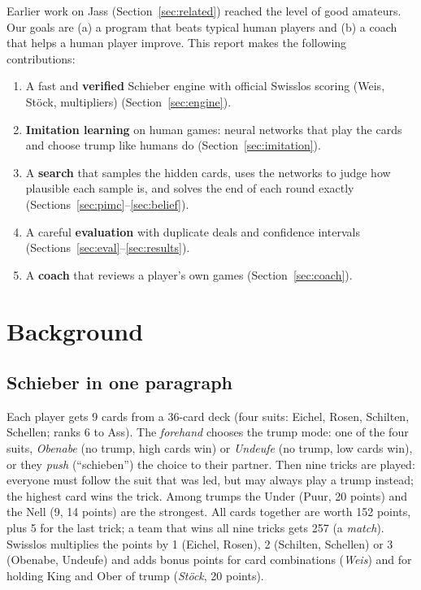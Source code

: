 \documentclass[10pt,a4paper]{article}
\begin{document}
Earlier work on Jass (Section~\ref{sec:related}) reached the level of good amateurs. Our goals are (a) a program that
beats typical human players and (b) a coach that helps a human player improve. This report makes the following
contributions:
\begin{enumerate}
\item A fast and \textbf{verified} Schieber engine with official Swisslos scoring (Weis, St\"ock, multipliers)
  (Section~\ref{sec:engine}).
\item \textbf{Imitation learning} on \NGames{} human games: neural networks that play the cards and choose trump
  like humans do (Section~\ref{sec:imitation}).
\item A \textbf{search} that samples the hidden cards, uses the networks to judge how plausible each sample is, and
  solves the end of each round exactly (Sections~\ref{sec:pimc}--\ref{sec:belief}).
\item A careful \textbf{evaluation} with duplicate deals and confidence intervals (Sections~\ref{sec:eval}--\ref{sec:results}).
\item A \textbf{coach} that reviews a player's own games (Section~\ref{sec:coach}).
\end{enumerate}

\section{Background}

\subsection{Schieber in one paragraph}
Each player gets 9 cards from a 36-card deck (four suits: Eichel, Rosen, Schilten, Schellen; ranks 6 to Ass).
The \emph{forehand} chooses the trump mode: one of the four suits, \emph{Obenabe} (no trump, high cards win) or
\emph{Undeufe} (no trump, low cards win), or they \emph{push} (``schieben'') the choice to their partner.
Then nine tricks are played: everyone must follow the suit that was led, but may always play a trump instead; the
highest card wins the trick. Among trumps the Under (Puur, 20 points) and the Nell (9, 14 points) are the strongest.
All cards together are worth 152 points, plus 5 for the last trick; a team that wins all nine tricks gets 257 (a
\emph{match}). Swisslos multiplies the points by 1 (Eichel, Rosen), 2 (Schilten, Schellen) or 3 (Obenabe, Undeufe) and
adds bonus points for card combinations (\emph{Weis}) and for holding King and Ober of trump (\emph{St\"ock}, 20 points).
\end{document}
